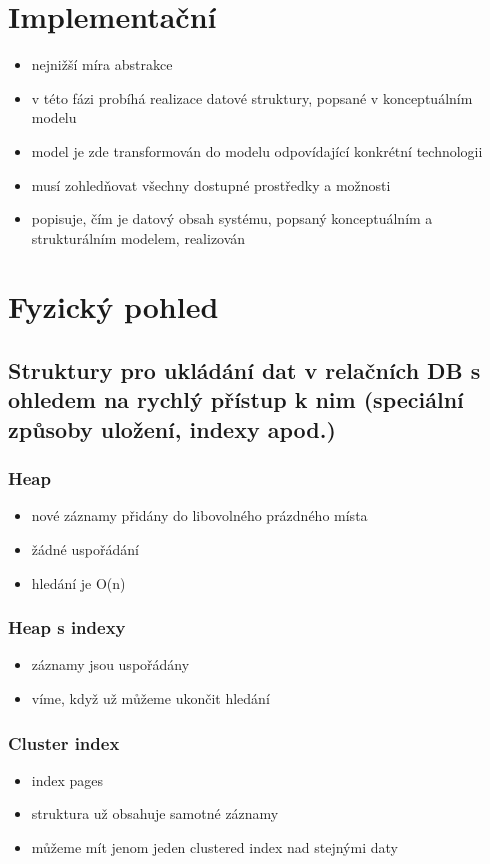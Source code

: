\documentclass{szzclass}
\begin{document}
\section{Implementační}
\begin{itemize}
  \item nejnižší míra abstrakce
  \item v této fázi probíhá realizace datové struktury, popsané v konceptuálním modelu
  \item model je zde transformován do modelu odpovídající konkrétní technologii
  \item musí zohledňovat všechny dostupné prostředky a možnosti
  \item popisuje, čím je datový obsah systému, popsaný konceptuálním a strukturálním modelem, realizován
\end{itemize}

\section{Fyzický pohled}
\subsection{Struktury pro ukládání dat v relačních DB s ohledem na rychlý přístup k nim (speciální způsoby uložení, indexy apod.)}
\subsubsection{Heap}
\begin{itemize}
  \item nové záznamy přidány do libovolného prázdného místa
  \item žádné uspořádání
  \item hledání je O(n)
\end{itemize}
\subsubsection{Heap s indexy}
\begin{itemize}
  \item záznamy jsou uspořádány
  \item víme, když už můžeme ukončit hledání
\end{itemize}
\subsubsection{Cluster index}
\begin{itemize}
  \item index pages
  \item struktura už obsahuje samotné záznamy
  \item můžeme mít jenom jeden clustered index nad stejnými daty
\end{itemize}
\end{document}
